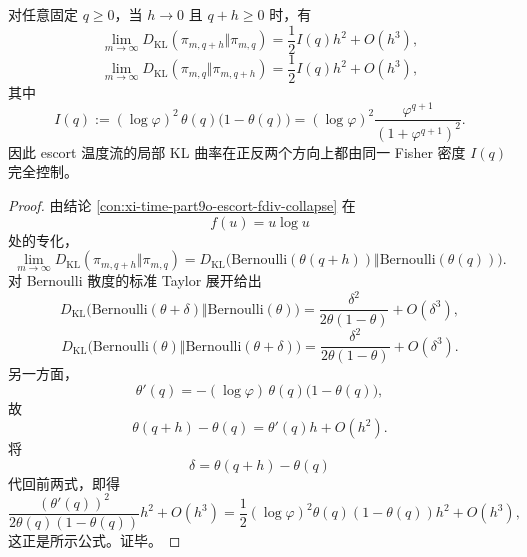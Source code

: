 \begin{theorem}\label{thm:xi-time-part9ob-escort-two-sided-local-kl}
对任意固定 \(q\ge 0\)，当 \(h\to 0\) 且 \(q+h\ge 0\) 时，有
\[
\lim_{m\to\infty}D_{\mathrm{KL}}(\pi_{m,q+h}\Vert \pi_{m,q})
=
\frac12 I(q)h^2+O(h^3),
\]
\[
\lim_{m\to\infty}D_{\mathrm{KL}}(\pi_{m,q}\Vert \pi_{m,q+h})
=
\frac12 I(q)h^2+O(h^3),
\]
其中
\[
I(q):=
(\log\varphi)^2\,\theta(q)\bigl(1-\theta(q)\bigr)
=
(\log\varphi)^2\frac{\varphi^{q+1}}{(1+\varphi^{q+1})^2}.
\]
因此 escort 温度流的局部 KL 曲率在正反两个方向上都由同一 Fisher 密度 \(I(q)\) 完全控制。
\end{theorem}
\begin{proof}
由结论 \ref{con:xi-time-part9o-escort-fdiv-collapse} 在
\[
f(u)=u\log u
\]
处的专化，
\[
\lim_{m\to\infty}D_{\mathrm{KL}}(\pi_{m,q+h}\Vert \pi_{m,q})
=
D_{\mathrm{KL}}\!\bigl(\mathrm{Bernoulli}(\theta(q+h))\Vert \mathrm{Bernoulli}(\theta(q))\bigr).
\]
对 Bernoulli 散度的标准 Taylor 展开给出
\[
D_{\mathrm{KL}}\!\bigl(\mathrm{Bernoulli}(\theta+\delta)\Vert \mathrm{Bernoulli}(\theta)\bigr)
=
\frac{\delta^2}{2\theta(1-\theta)}+O(\delta^3),
\]
\[
D_{\mathrm{KL}}\!\bigl(\mathrm{Bernoulli}(\theta)\Vert \mathrm{Bernoulli}(\theta+\delta)\bigr)
=
\frac{\delta^2}{2\theta(1-\theta)}+O(\delta^3).
\]
另一方面，
\[
\theta'(q)
=
-(\log\varphi)\,\theta(q)\bigl(1-\theta(q)\bigr),
\]
故
\[
\theta(q+h)-\theta(q)=\theta'(q)h+O(h^2).
\]
将
\[
\delta=\theta(q+h)-\theta(q)
\]
代回前两式，即得
\[
\frac{(\theta'(q))^2}{2\theta(q)(1-\theta(q))}h^2+O(h^3)
=
\frac12(\log\varphi)^2\theta(q)(1-\theta(q))h^2+O(h^3),
\]
这正是所示公式。证毕。
\end{proof}

